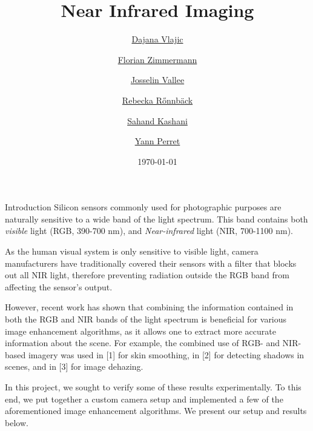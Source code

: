 \documentclass[10pt]{article}
\title{Near Infrared Imaging}
\author{
    \href{mailto:dajana.vlajic@epfl.ch}{Dajana Vlajic} \and
    \href{mailto:florian.zimmermann@epfl.ch}{Florian Zimmermann} \and
    \href{mailto:josselin.vallee@epfl.ch}{Josselin Vallee} \and
    \href{mailto:rebecka.ronnback@epfl.ch}{Rebecka R{\H o}nnb{\"a}ck} \and
    \href{mailto:sahand.kashani-akhavan@epfl.ch}{Sahand Kashani} \and
    \href{mailto:yann.perret@epfl.ch}{Yann Perret}
}
\date{\today}
\begin{document}
\maketitle

\begin{section}{Introduction}
    \label{sec:introduction}
    Silicon sensors commonly used for photographic purposes are naturally sensitive to a wide band of the light spectrum. This band contains both \emph{visible} light (RGB, 390-700 nm), and \emph{Near-infrared} light (NIR, 700-1100 nm).

    \medskip

    As the human visual system is only sensitive to visible light, camera manufacturers have traditionally covered their sensors with a filter that blocks out all NIR light, therefore preventing radiation outside the RGB band from affecting the sensor's output.

    \medskip

    However, recent work has shown that combining the information contained in both the RGB and NIR bands of the light spectrum is beneficial for various image enhancement algorithms, as it allows one to extract more accurate information about the scene. For example, the combined use of RGB- and NIR-based imagery was used in [1] for skin smoothing, in [2] for detecting shadows in scenes, and in [3] for image dehazing.

    \medskip

    In this project, we sought to verify some of these results experimentally. To this end, we put together a custom camera setup and implemented a few of the aforementioned image enhancement algorithms. We present our setup and results below.

\end{section}

\end{document}

